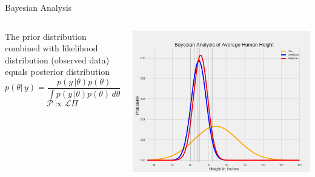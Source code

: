 \documentclass[12pt, aspectratio=149]{beamer}
\theoremstyle{plain}
\begin{document}
\begin{frame}{Bayesian Analysis}
\begin{columns}
\begin{column}{0.5\linewidth}
The prior distribution combined with likelihood distribution (observed data) equals posterior distribution
\begin{equation}
p(\theta \vert \, y)= \frac{p(y \, \vert \theta)p(\theta)}{\int p(y \, \vert \theta)p(\theta) \, d\theta}
\end{equation}
\begin{equation}
\mathcal{P} \propto \mathcal{L}\Pi
\end{equation}
\end{column}
\begin{column}{0.5\linewidth}
\includegraphics[scale=0.17]{figs/prior_likelihood_posterior_example.png}
\end{column}
\end{columns}
\end{frame}
\end{document}
